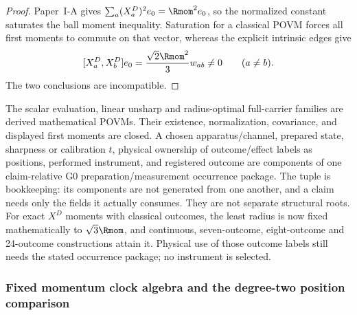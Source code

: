 \documentclass[12pt,a4paper]{article}
\begin{document}
\begin{proof}
Paper~I-A gives
\(\sum_a(X_a^D)^2e_0=\Rmom^2e_0\), so the normalized constant saturates the
ball moment inequality.  Saturation for a classical POVM forces all first
moments to commute on that vector, whereas the explicit intrinsic edges give
\[
 [X_a^D,X_b^D]e_0
 =\frac{\sqrt2\Rmom^2}{3}w_{ab}\ne0
 \qquad(a\ne b).
\]
The two conclusions are incompatible.
\end{proof}

\begin{remark}
The scalar evaluation, linear unsharp and radius-optimal full-carrier
families are derived mathematical POVMs.  Their existence, normalization, covariance, and displayed
first moments are closed.  A chosen apparatus/channel, prepared state,
sharpness or calibration \(t\), physical ownership of outcome/effect labels
as positions, performed instrument, and registered outcome are components of
one claim-relative G0 preparation/measurement occurrence package.  The tuple
is bookkeeping: its components are not generated from one another, and a
claim needs only the fields it actually consumes.  They are not separate
structural roots. For exact $X^D$ moments with classical outcomes, the
least radius is now fixed mathematically to $\sqrt3\Rmom$, and continuous,
seven-outcome, eight-outcome and 24-outcome constructions attain it. Physical use of those outcome
labels still needs the stated occurrence package; no instrument is selected.
\end{remark}


\subsubsection{Fixed momentum clock algebra and the degree-two position comparison}
\label{p2c:sec:v180-clock-comparison-band}
\end{document}
